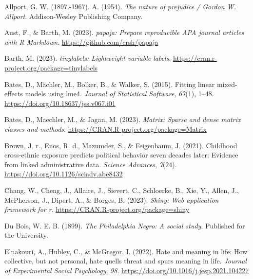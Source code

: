 \documentclass[
  man,floatsintext]{apa7}
\newlength{\cslhangindent}
\newlength{\cslentryspacingunit} %
\newenvironment{CSLReferences}[2] %
 {%
  \setlength{\parindent}{0pt}
  \ifodd #1
  \let\oldpar\par
  \def\par{\hangindent=\cslhangindent\oldpar}
  \fi
  \setlength{\parskip}{#2\cslentryspacingunit}
 }%
 {}
\begin{document}
\begin{CSLReferences}{1}{0}
\leavevmode{}%
Allport, G. W. (1897.-1967). A. (1954). \emph{The nature of prejudice / {Gordon W}. {Allport}}. {Addison-Wesley Publishing Company}.

\leavevmode{}%
Aust, F., \& Barth, M. (2023). \emph{{papaja}: {Prepare} reproducible {APA} journal articles with {R Markdown}}. \url{https://github.com/crsh/papaja}

\leavevmode{}%
Barth, M. (2023). \emph{{tinylabels}: Lightweight variable labels}. \url{https://cran.r-project.org/package=tinylabels}

\leavevmode{}%
Bates, D., Mächler, M., Bolker, B., \& Walker, S. (2015). Fitting linear mixed-effects models using {lme4}. \emph{Journal of Statistical Software}, \emph{67}(1), 1--48. \url{https://doi.org/10.18637/jss.v067.i01}

\leavevmode{}%
Bates, D., Maechler, M., \& Jagan, M. (2023). \emph{Matrix: Sparse and dense matrix classes and methods}. \url{https://CRAN.R-project.org/package=Matrix}

\leavevmode{}%
Brown, J. r., Enos, R. d., Mazumder, S., \& Feigenbaum, J. (2021). Childhood cross-ethnic exposure predicts political behavior seven decades later: {Evidence} from linked administrative data. \emph{Science Advances}, \emph{7}(24). \url{https://doi.org/10.1126/sciadv.abe8432}

\leavevmode{}%
Chang, W., Cheng, J., Allaire, J., Sievert, C., Schloerke, B., Xie, Y., Allen, J., McPherson, J., Dipert, A., \& Borges, B. (2023). \emph{Shiny: Web application framework for r}. \url{https://CRAN.R-project.org/package=shiny}

\leavevmode{}%
Du Bois, W. E. B. (1899). \emph{The {Philadelphia Negro}: A social study}. {Published for the University}.

\leavevmode{}%
Elnakouri, A., Hubley, C., \& McGregor, I. (2022). Hate and meaning in life: {How} collective, but not personal, hate quells threat and spurs meaning in life. \emph{Journal of Experimental Social Psychology}, \emph{98}. \url{https://doi.org/10.1016/j.jesp.2021.104227}


\end{CSLReferences}
\end{document}
